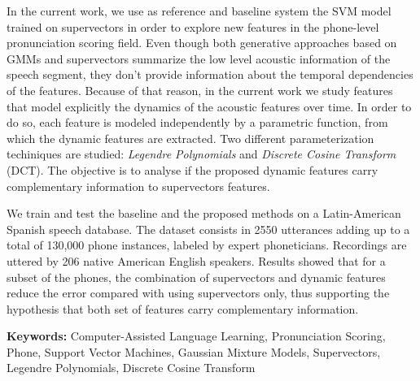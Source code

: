 In the current work, we use as reference and baseline system the SVM model
trained on supervectors in order to explore new features in the
phone-level pronunciation scoring field.
Even though both generative approaches based on GMMs and supervectors
summarize the low level acoustic information of the speech segment,
they don't provide information about the temporal dependencies of the features.
Because of that reason, in the current work we study
features that model explicitly the dynamics of the
acoustic features over time. In order to do so, each feature is modeled independently
by a parametric function, from which the dynamic features are extracted.
Two different parameterization techiniques are studied:
\textit{Legendre Polynomials} and \textit{Discrete Cosine Transform} (DCT).
The objective is to analyse if the proposed dynamic features carry
complementary information to supervectors features.

We train and test the baseline and the proposed methods on a
Latin-American Spanish speech database.
The dataset consists in 2550 utterances adding up to a total of
130,000 phone instances, labeled
by expert phoneticians. Recordings are uttered by 206 native American English speakers.
Results showed that for a subset of the phones, the combination of supervectors and
dynamic features reduce the error compared with using supervectors only, thus supporting
the hypothesis that both set of features carry complementary information.

\bigskip

\noindent\textbf{Keywords:} Computer-Assisted Language Learning, Pronunciation Scoring, Phone, Support Vector Machines, Gaussian Mixture Models, Supervectors, Legendre Polynomials, Discrete Cosine Transform
